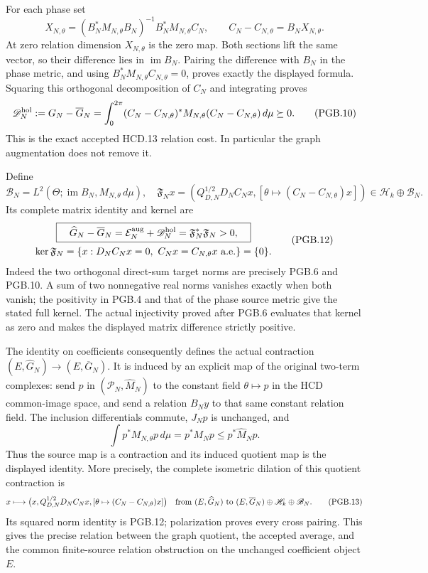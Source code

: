 For each phase set
\[
 X_{N,\theta}=(B_N^*M_{N,\theta}B_N)^{-1}
                          B_N^*M_{N,\theta}C_N,
 \qquad C_N-C_{N,\theta}=B_NX_{N,\theta}.
 \tag{PGB.9}\label{eq:pgb-original-relation-field}
\]
At zero relation dimension $X_{N,\theta}$ is the zero map.
Both sections lift the same vector, so their difference lies in
$\operatorname{im}B_N$. Pairing the difference with $B_N$ in
the phase metric, and using $B_N^*M_{N,\theta}C_{N,\theta}=0$,
proves exactly the displayed formula. Squaring this orthogonal
decomposition of $C_N$ and integrating proves
\[
 \mathscr D_N^{\rm hol}:=G_N-\overline G_N
 =\int_0^{2\pi}(C_N-C_{N,\theta})^*M_{N,\theta}
                      (C_N-C_{N,\theta})\,d\mu\succeq0.
 \tag{PGB.10}\label{eq:pgb-original-gap}
\]
This is the exact accepted HCD.13 relation cost. In particular
the graph augmentation does not remove it.

Define
\[
 \mathscr B_N=L^2(\Theta;\operatorname{im}B_N,
                                  M_{N,\theta}\,d\mu),
 \quad
 \mathfrak F_Nx=
 \left(Q_{D,N}^{1/2}D_NC_Nx,
       [\theta\mapsto(C_N-C_{N,\theta})x]\right)
 \in\mathscr H_k\oplus\mathscr B_N.
 \tag{PGB.11}\label{eq:pgb-full-defect-map}
\]
Its complete matrix identity and kernel are
\[
 \begin{gathered}
 \boxed{\quad
 \widehat G_N-\overline G_N
 =\mathcal E_N^{\rm aug}+\mathscr D_N^{\rm hol}
 =\mathfrak F_N^*\mathfrak F_N>0,\quad}\\
 \ker\mathfrak F_N
 =\{x:D_NC_Nx=0,\ C_Nx=C_{N,\theta}x\text{ a.e.}\}=\{0\}.
 \end{gathered}
 \tag{PGB.12}\label{eq:pgb-main-bridge}
\]
Indeed the two orthogonal direct-sum target norms are precisely
PGB.6 and PGB.10. A sum of two nonnegative real norms vanishes
exactly when both vanish; the positivity in PGB.4 and that of
the phase source metric give the stated full kernel.
The actual injectivity proved after PGB.6 evaluates that kernel
as zero and makes the displayed matrix difference strictly positive.

The identity on coefficients consequently defines the actual
contraction $(E,\widehat G_N)\to(E,\overline G_N)$. It is
induced by an explicit map of the original two-term complexes:
send $p$ in $(\mathcal P_N,\widehat M_N)$ to the constant
field $\theta\mapsto p$ in the HCD common-image space, and
send a relation $B_Ny$ to that same constant relation field.
The inclusion differentials commute, $J_Np$ is unchanged, and
\[
 \int p^*M_{N,\theta}p\,d\mu=p^*M_Np
                  \leq p^*\widehat M_Np.
\]
Thus the source map is a contraction and its induced quotient
map is the displayed identity. More precisely, the complete
isometric dilation of this quotient contraction is
\[
 x\longmapsto
 \bigl(x,Q_{D,N}^{1/2}D_NC_Nx,
             [\theta\mapsto(C_N-C_{N,\theta})x]\bigr)
 \quad\hbox{from }(E,\widehat G_N)
 \hbox{ to }(E,\overline G_N)\oplus\mathscr H_k\oplus\mathscr B_N.
 \tag{PGB.13}\label{eq:pgb-isometric-dilation}
\]
Its squared norm identity is PGB.12; polarization proves every
cross pairing. This gives the precise relation between the graph
quotient, the accepted average, and the common finite-source
relation obstruction on the unchanged coefficient object $E$.

